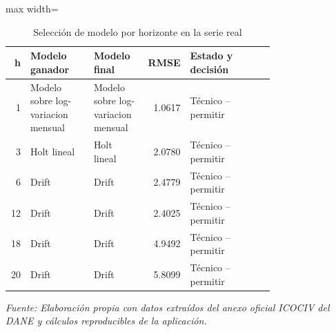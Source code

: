 \begin{table}[H]
\centering
\caption{Selección de modelo por horizonte en la serie real}
\label{tab:ejemplo_seleccion_modelo_vias_urbanas}
\scriptsize
\begin{adjustbox}{max width=\linewidth}
\begin{tabular}{rp{0.24\linewidth}p{0.20\linewidth}rp{0.32\linewidth}}
\toprule
h & Modelo ganador & Modelo final & RMSE & Estado y decisión \\
\midrule
1 & Modelo sobre log-variacion mensual & Modelo sobre log-variacion mensual & 1.0617 & Técnico -- permitir \\
3 & Holt lineal & Holt lineal & 2.0780 & Técnico -- permitir \\
6 & Drift & Drift & 2.4779 & Técnico -- permitir \\
12 & Drift & Drift & 2.4025 & Técnico -- permitir \\
18 & Drift & Drift & 4.9492 & Técnico -- permitir \\
20 & Drift & Drift & 5.8099 & Técnico -- permitir \\
\bottomrule
\end{tabular}
\end{adjustbox}
\par\footnotesize\textit{Fuente: Elaboración propia con datos extraídos del anexo oficial ICOCIV del DANE y cálculos reproducibles de la aplicación.}
\end{table}
